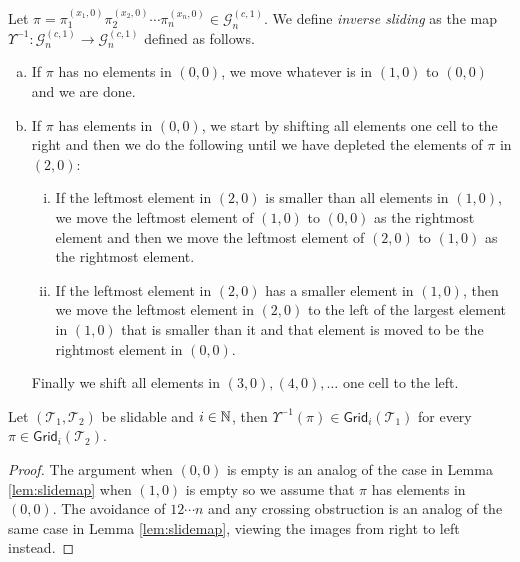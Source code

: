 \begin{definition}
Let $\pi = \pi_1^{(x_1,0)}\pi_2^{(x_2,0)}\cdots\pi_n^{(x_n,0)} \in \mathcal{G}^{(c,1)}_n$. We define \emph{inverse sliding} as the map $\Upsilon^{-1}: \mathcal{G}^{(c,1)}_n \to \mathcal{G}^{(c,1)}_n$ defined as follows.
\begin{enumerate}[a)]
    \item If $\pi$ has no elements in $(0,0)$, we move whatever is in $(1,0)$ to $(0,0)$ and we are done.
    \item If $\pi$ has elements in $(0,0)$, we start by shifting all elements one cell to the right and then we do the following until we have depleted the elements of $\pi$ in $(2,0)$:
    \begin{enumerate}[i.]
        \item If the leftmost element in $(2,0)$ is smaller than all elements in $(1,0)$, we move the leftmost element of $(1,0)$ to $(0,0)$ as the rightmost element and then we move the leftmost element of $(2,0)$ to $(1,0)$ as the rightmost element.
        \item If the leftmost element in $(2,0)$ has a smaller element in $(1,0)$, then we move the leftmost element in $(2,0)$ to the left of the largest element in $(1,0)$ that is smaller than it and that element is moved to be the rightmost element in $(0,0)$.
    \end{enumerate}
    Finally we shift all elements in $(3,0), (4,0), \ldots$ one cell to the left.
\end{enumerate}
\end{definition}

\begin{lemma}
Let $(\mathcal{T}_1,\mathcal{T}_2)$ be slidable and $i \in \mathbb{N}$, then $\Upsilon^{-1}(\pi) \in \textsf{Grid}_i(\mathcal{T}_1)$ for every $\pi \in \textsf{Grid}_i(\mathcal{T}_2)$.
\end{lemma}
\begin{proof}
The argument when $(0,0)$ is empty is an analog of the case in Lemma \ref{lem:slidemap} when $(1,0)$ is empty so we assume that $\pi$ has elements in $(0,0)$. The avoidance of $12\cdots n$ and any crossing obstruction is an analog of the same case in Lemma \ref{lem:slidemap}, viewing the images from right to left instead.
\end{proof}

